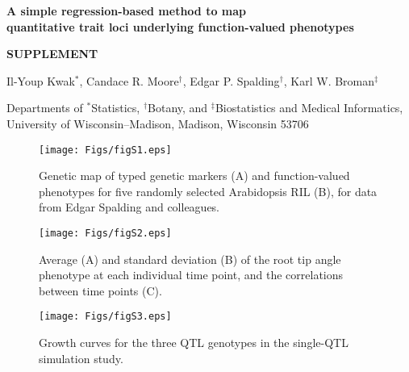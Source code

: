 \documentclass[letterpaper,twoside]{article}
\begin{document}
\vspace*{8mm}
\begin{center}

\textbf{\Large A simple regression-based method to map \\[6pt]
  quantitative trait loci underlying function-valued
  phenotypes}

\bigskip \bigskip \bigskip \bigskip

\textbf{\Large SUPPLEMENT}

\bigskip \bigskip
\bigskip \bigskip


{\large Il-Youp Kwak$^*$, Candace R. Moore$^\dagger$, Edgar
  P. Spalding$^\dagger$, Karl W. Broman$^{\ddagger}$}

\bigskip \bigskip

Departments of $^*$Statistics, $^\dagger$Botany, and $^\ddagger$Biostatistics and Medical
Informatics, \\
University of Wisconsin--Madison, Madison, Wisconsin 53706
\end{center}




\clearpage

\begin{figure}[p]
\centerline{\texttt{[image: Figs/figS1.eps]}}

\caption{Genetic map of typed genetic markers (A)
     and function-valued phenotypes for five randomly selected
     Arabidopsis RIL (B), for data from Edgar Spalding and colleagues.}
\end{figure}

\clearpage

\begin{figure}[p]
\centerline{\texttt{[image: Figs/figS2.eps]}}
\vspace{1cm}

\caption{Average (A) and standard deviation (B) of the root tip angle phenotype at
  each individual time point, and the correlations between time points (C).}
\end{figure}

\clearpage

\begin{figure}[!ht]
\begin{center}
\texttt{[image: Figs/figS3.eps]}
\vspace{1cm}
 \caption{Growth curves for the three QTL genotypes in the single-QTL
   simulation study.}
\end{center}
\end{figure}
\end{document}
